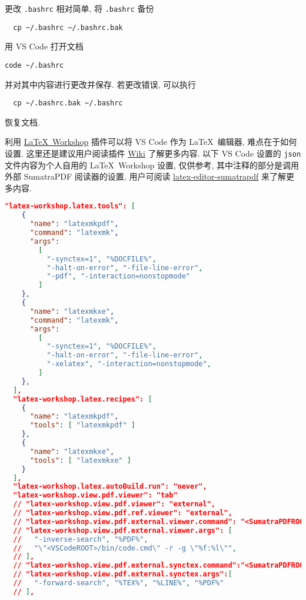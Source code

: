 更改 \texttt{.bashrc} 相对简单,
将 \texttt{.bashrc} 备份
\begin{lstlisting}
  cp ~/.bashrc ~/.bashrc.bak
\end{lstlisting}
用 VS Code 打开文档
\begin{lstlisting}[morekeywords = code]
  code ~/.bashrc
\end{lstlisting}
并对其中内容进行更改并保存.
若更改错误,
可以执行
\begin{lstlisting}
  cp ~/.bashrc.bak ~/.bashrc
\end{lstlisting}
恢复文档.

利用
\href{https://marketplace.visualstudio.com/items?itemName=James-Yu.latex-workshop}{\LaTeX\ Workshop}
插件可以将 VS Code 作为 \LaTeX\ 编辑器,
难点在于如何设置.
这里还是建议用户阅读插件
\href{https://github.com/James-Yu/LaTeX-Workshop/wiki}{Wiki}
了解更多内容.
以下 VS Code 设置的 \texttt{json} 文件内容为个人自用的 \LaTeX\ Workshop 设置,
仅供参考,
其中注释的部分是调用外部 SumatraPDF 阅读器的设置,
用户可阅读
\href{https://github.com/OsbertWang/latex-editor-sumatrapdf}{\textsf{latex-editor-sumatrapdf}}
来了解更多内容.
\begin{lstlisting}[language = json]
  "latex-workshop.latex.tools": [
    {
      "name": "latexmkpdf",
      "command": "latexmk",
      "args":
        [
          "-synctex=1", "%DOCFILE%",
          "-halt-on-error", "-file-line-error",
          "-pdf", "-interaction=nonstopmode"
        ]
    },
    {
      "name": "latexmkxe",
      "command": "latexmk",
      "args":
        [
          "-synctex=1", "%DOCFILE%",
          "-halt-on-error", "-file-line-error", 
          "-xelatex", "-interaction=nonstopmode",
        ]
    },
  ],
  "latex-workshop.latex.recipes": [
    {
      "name": "latexmkpdf",
      "tools": [ "latexmkpdf" ]
    },
    {
      "name": "latexmkxe",
      "tools": [ "latexmkxe" ]
    }
  ],
  "latex-workshop.latex.autoBuild.run": "never",
  "latex-workshop.view.pdf.viewer": "tab"
  // "latex-workshop.view.pdf.viewer": "external",
  // "latex-workshop.view.pdf.ref.viewer": "external",
  // "latex-workshop.view.pdf.external.viewer.command": "<SumatraPDFROOT>/SumatraPDF.exe",
  // "latex-workshop.view.pdf.external.viewer.args": [
  //   "-inverse-search", "%PDF%",
  //   "\"<VSCodeROOT>/bin/code.cmd\" -r -g \"%f:%l\"",
  // ],
  // "latex-workshop.view.pdf.external.synctex.command":"<SumatraPDFROOT>/SumatraPDF.exe",
  // "latex-workshop.view.pdf.external.synctex.args":[
  //   "-forward-search", "%TEX%", "%LINE%", "%PDF%"
  // ],
\end{lstlisting}

